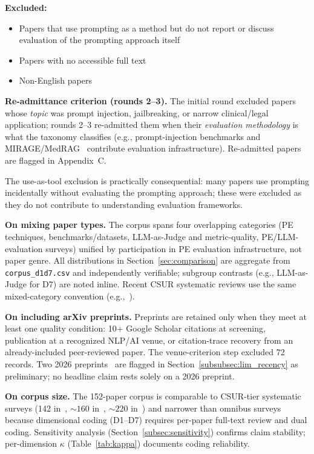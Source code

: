 \documentclass[acmsmall, nonacm, screen]{acmart}
\begin{document}
\textbf{Excluded:}
\begin{itemize}
\item Papers that use prompting as a method but do not report
or discuss evaluation of the prompting approach itself
\item Papers with no accessible full text
\item Non-English papers
\end{itemize}

\textbf{Re-admittance criterion (rounds 2--3).} The initial round
excluded papers whose \emph{topic} was prompt injection,
jailbreaking, or narrow clinical/legal application; rounds 2--3
re-admitted them when their \emph{evaluation methodology} is what
the taxonomy classifies (e.g., prompt-injection benchmarks and
MIRAGE/MedRAG~\cite{xiong2024medrag} contribute evaluation
infrastructure). Re-admitted papers are flagged in Appendix~C.

The use-as-tool exclusion is practically consequential: many papers
use prompting incidentally without evaluating the prompting
approach; these were excluded as they do not contribute to
understanding evaluation frameworks.

\textbf{On mixing paper types.} The corpus spans four overlapping
categories (PE techniques, benchmarks/datasets, LLM-as-Judge and
metric-quality, PE/LLM-evaluation surveys) unified by participation
in PE evaluation infrastructure, not paper genre. All distributions
in Section~\ref{sec:comparison} are aggregate from
\texttt{corpus\_d1d7.csv} and independently verifiable; subgroup
contrasts (e.g., LLM-as-Judge for D7) are noted inline. Recent CSUR
systematic reviews use the same mixed-category convention
(e.g.,~\cite{edemacu2024privacysurvey, chang2023survey}).

\textbf{On including arXiv preprints.} Preprints are retained only
when they meet at least one quality condition: 10+ Google Scholar
citations at screening, publication at a recognized NLP/AI venue, or
citation-trace recovery from an already-included peer-reviewed paper.
The venue-criterion step excluded 72 records. Two 2026
preprints~\cite{bellibatlu2026judgesense, benchmark2sq2026} are
flagged in Section~\ref{subsubsec:lim_recency} as preliminary; no
headline claim rests solely on a 2026 preprint.

\textbf{On corpus size.} The 152-paper corpus is comparable to
CSUR-tier systematic surveys (142 in~\cite{edemacu2024privacysurvey},
${\sim}160$ in~\cite{sahoo2024systematic}, ${\sim}220$
in~\cite{chang2023survey}) and narrower than omnibus surveys because
dimensional coding (D1--D7) requires per-paper full-text review and
dual coding. Sensitivity analysis (Section~\ref{subsec:sensitivity})
confirms claim stability; per-dimension $\kappa$
(Table~\ref{tab:kappa}) documents coding reliability.
\end{document}
